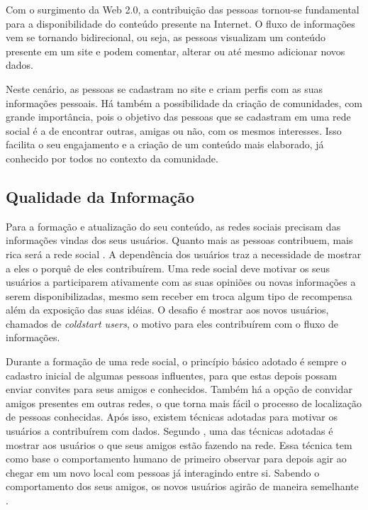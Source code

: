 Com o surgimento da Web 2.0, a contribuição das pessoas tornou-se fundamental para a disponibilidade do conteúdo presente na Internet. O fluxo de informações vem se tornando bidirecional, ou seja, as pessoas visualizam um conteúdo presente em um site e podem comentar, alterar ou até mesmo adicionar novos dados.

Neste cenário, as pessoas se cadastram no site e criam perfis com as suas informações pessoais. Há também a possibilidade da criação de comunidades, com grande importância, pois o objetivo das pessoas que se cadastram em uma rede social é a de encontrar outras, amigas ou não, com os mesmos interesses. Isso facilita o seu engajamento e a criação de um conteúdo mais elaborado, já conhecido por todos no contexto da comunidade.

\subsection{Qualidade da Informação}

Para a formação e atualização do seu conteúdo, as redes sociais precisam das informações vindas dos seus usuários. Quanto mais as pessoas contribuem, mais rica será a rede social \cite{burke2009fmm}. A dependência dos usuários traz a necessidade de mostrar a eles o porquê de eles contribuírem. Uma rede social deve motivar os seus usuários a participarem ativamente com as suas opiniões ou novas informações a serem disponibilizadas, mesmo sem receber em troca algum tipo de recompensa além da exposição das suas idéias. O desafio é mostrar aos novos usuários, chamados de \textit{coldstart users}, o motivo para eles contribuírem com o fluxo de informações.

Durante a formação de uma rede social, o princípio básico adotado é sempre o cadastro inicial de algumas pessoas influentes, para que estas depois possam enviar convites para seus amigos e conhecidos. Também há a opção de convidar amigos presentes em outras redes, o que torna mais fácil o processo de localização de pessoas conhecidas. Após isso, existem técnicas adotadas para motivar os usuários a contribuírem com dados. Segundo \cite{burke2009fmm}, uma das técnicas adotadas é mostrar aos usuários o que seus amigos estão fazendo na rede. Essa técnica tem como base o comportamento humano de primeiro observar para depois agir ao chegar em um novo local com pessoas já interagindo entre si. Sabendo o comportamento dos seus amigos, os novos usuários agirão de maneira semelhante \cite{burke2009fmm}.

